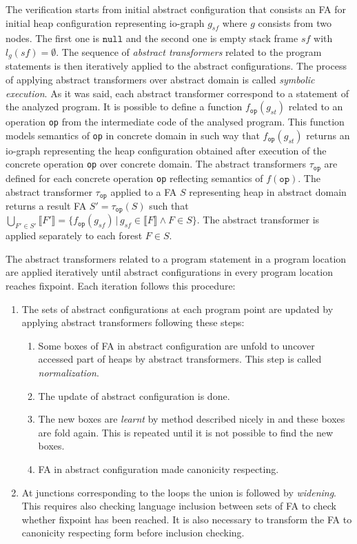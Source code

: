 The verification starts from initial abstract configuration that consists an FA for initial heap configuration representing io-graph
$g_{\mathit{sf}}$ where $g$ consists from two nodes.
The first one is $\texttt{null}$ and the second one is empty stack frame $sf$ with $l_g(\mathit{sf}) = \emptyset$.
The sequence of \emph{abstract transformers} related to the program statements is then iteratively applied to the abstract configurations.
The process of applying abstract transformers over abstract domain is called \emph{symbolic execution}.
As it was said, each abstract transformer correspond to a statement of the analyzed program.
It is possible to define a function $f_{\texttt{op}}(g_{st})$ related to an operation \texttt{op} from the intermediate code of the analysed program.
This function models semantics of \texttt{op} in concrete domain in such way that $f_{\texttt{op}}(g_{\mathit{st}})$
returns an io-graph representing the heap configuration obtained after execution of the concrete operation \texttt{op} over concrete domain.
The abstract transformers $\tau_{\texttt{op}}$ are defined for each concrete operation \texttt{op} reflecting semantics of $f(\texttt{op})$.
The abstract transformer $\tau_{\texttt{op}}$ applied to a FA $S$ representing heap in abstract domain returns a result FA $S' = \tau_{\texttt{op}}(S)$
such that $\bigcup_{F' \in S'} \llbracket F' \rrbracket = \{ f_{\texttt{op}}(g_{sf}) \,|\, g_{sf} \in \llbracket F \rrbracket \wedge F \in S \}$.
The abstract transformer is applied separately to each forest $F \in S$.

The abstract transformers related to a program statement in a program location are applied iteratively until
abstract configurations in every program location reaches fixpoint.
Each iteration follows this procedure:
\begin{enumerate}
		\item The sets of abstract configurations at each program point are updated by applying abstract transformers following
			these steps:
			\begin{enumerate}
				\item Some boxes of FA in abstract configuration are unfold to uncover accessed part of heaps by abstract transformers.
					This step is called \emph{normalization}.
				\item The update of abstract configuration is done.
				\item The new boxes are \emph{learnt} by method described nicely in \cite{forester13}
					and these boxes are fold again.
					This is repeated until it is not possible to find the new boxes.
				\item FA in abstract configuration made canonicity respecting.
			\end{enumerate}
		\item At junctions corresponding to the loops the union is followed by \emph{widening}.
			This requires also checking language inclusion between sets of FA to check whether fixpoint has been reached.
			It is also necessary to transform the FA to canonicity respecting form before inclusion checking.
\end{enumerate}

